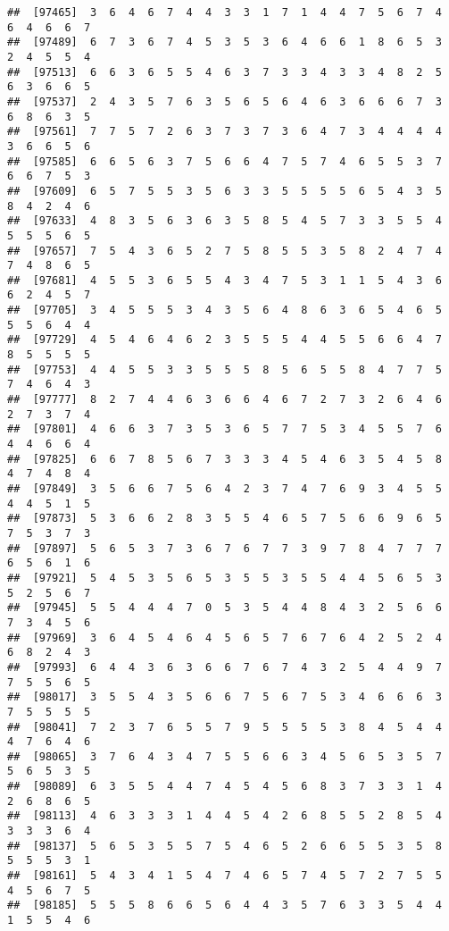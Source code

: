\documentclass[
]{book}
\begin{document}
\begin{verbatim}
##  [97465]  3  6  4  6  7  4  4  3  3  1  7  1  4  4  7  5  6  7  4  6  4  6  6  7
##  [97489]  6  7  3  6  7  4  5  3  5  3  6  4  6  6  1  8  6  5  3  2  4  5  5  4
##  [97513]  6  6  3  6  5  5  4  6  3  7  3  3  4  3  3  4  8  2  5  6  3  6  6  5
##  [97537]  2  4  3  5  7  6  3  5  6  5  6  4  6  3  6  6  6  7  3  6  8  6  3  5
##  [97561]  7  7  5  7  2  6  3  7  3  7  3  6  4  7  3  4  4  4  4  3  6  6  5  6
##  [97585]  6  6  5  6  3  7  5  6  6  4  7  5  7  4  6  5  5  3  7  6  6  7  5  3
##  [97609]  6  5  7  5  5  3  5  6  3  3  5  5  5  5  6  5  4  3  5  8  4  2  4  6
##  [97633]  4  8  3  5  6  3  6  3  5  8  5  4  5  7  3  3  5  5  4  5  5  5  6  5
##  [97657]  7  5  4  3  6  5  2  7  5  8  5  5  3  5  8  2  4  7  4  7  4  8  6  5
##  [97681]  4  5  5  3  6  5  5  4  3  4  7  5  3  1  1  5  4  3  6  6  2  4  5  7
##  [97705]  3  4  5  5  5  3  4  3  5  6  4  8  6  3  6  5  4  6  5  5  5  6  4  4
##  [97729]  4  5  4  6  4  6  2  3  5  5  5  4  4  5  5  6  6  4  7  8  5  5  5  5
##  [97753]  4  4  5  5  3  3  5  5  5  8  5  6  5  5  8  4  7  7  5  7  4  6  4  3
##  [97777]  8  2  7  4  4  6  3  6  6  4  6  7  2  7  3  2  6  4  6  2  7  3  7  4
##  [97801]  4  6  6  3  7  3  5  3  6  5  7  7  5  3  4  5  5  7  6  4  4  6  6  4
##  [97825]  6  6  7  8  5  6  7  3  3  3  4  5  4  6  3  5  4  5  8  4  7  4  8  4
##  [97849]  3  5  6  6  7  5  6  4  2  3  7  4  7  6  9  3  4  5  5  4  4  5  1  5
##  [97873]  5  3  6  6  2  8  3  5  5  4  6  5  7  5  6  6  9  6  5  7  5  3  7  3
##  [97897]  5  6  5  3  7  3  6  7  6  7  7  3  9  7  8  4  7  7  7  6  5  6  1  6
##  [97921]  5  4  5  3  5  6  5  3  5  5  3  5  5  4  4  5  6  5  3  5  2  5  6  7
##  [97945]  5  5  4  4  4  7  0  5  3  5  4  4  8  4  3  2  5  6  6  7  3  4  5  6
##  [97969]  3  6  4  5  4  6  4  5  6  5  7  6  7  6  4  2  5  2  4  6  8  2  4  3
##  [97993]  6  4  4  3  6  3  6  6  7  6  7  4  3  2  5  4  4  9  7  7  5  5  6  5
##  [98017]  3  5  5  4  3  5  6  6  7  5  6  7  5  3  4  6  6  6  3  7  5  5  5  5
##  [98041]  7  2  3  7  6  5  5  7  9  5  5  5  5  3  8  4  5  4  4  4  7  6  4  6
##  [98065]  3  7  6  4  3  4  7  5  5  6  6  3  4  5  6  5  3  5  7  5  6  5  3  5
##  [98089]  6  3  5  5  4  4  7  4  5  4  5  6  8  3  7  3  3  1  4  2  6  8  6  5
##  [98113]  4  6  3  3  3  1  4  4  5  4  2  6  8  5  5  2  8  5  4  3  3  3  6  4
##  [98137]  5  6  5  3  5  5  7  5  4  6  5  2  6  6  5  5  3  5  8  5  5  5  3  1
##  [98161]  5  4  3  4  1  5  4  7  4  6  5  7  4  5  7  2  7  5  5  4  5  6  7  5
##  [98185]  5  5  5  8  6  6  5  6  4  4  3  5  7  6  3  3  5  4  4  1  5  5  4  6

\end{verbatim}
\end{document}
